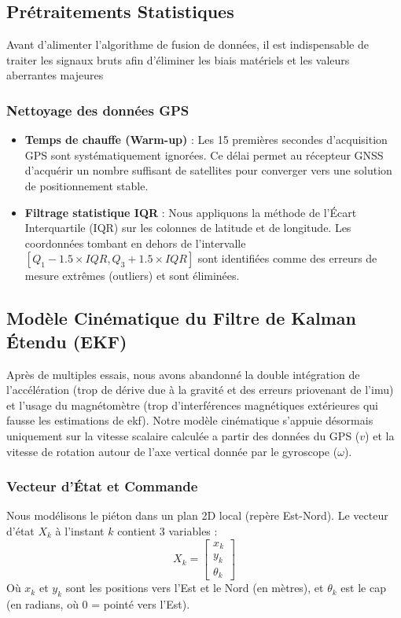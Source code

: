 \subsection{Prétraitements Statistiques}

Avant d'alimenter l'algorithme de fusion de données, il est indispensable de traiter les signaux bruts afin d'éliminer les biais matériels et les valeurs aberrantes majeures

\subsubsection{Nettoyage des données GPS}
\begin{itemize}
    \item[$\bullet$] \textbf{Temps de chauffe (Warm-up)} : Les 15 premières secondes d'acquisition GPS sont systématiquement ignorées. Ce délai permet au récepteur GNSS d'acquérir un nombre suffisant de satellites pour converger vers une solution de positionnement stable.
    \item[$\bullet$] \textbf{Filtrage statistique IQR} : Nous appliquons la méthode de l'Écart Interquartile (IQR) sur les colonnes de latitude et de longitude. Les coordonnées tombant en dehors de l'intervalle $[Q_1 - 1.5 \times IQR, Q_3 + 1.5 \times IQR]$ sont identifiées comme des erreurs de mesure extrêmes (outliers) et sont éliminées.
\end{itemize}



\subsection{Modèle Cinématique du Filtre de Kalman Étendu (EKF)}
\label{sec:ekf}

Après de multiples essais, nous avons abandonné la double intégration de l'accélération (trop de dérive due à la gravité et des erreurs priovenant de l'imu) et l'usage du magnétomètre (trop d'interférences magnétiques extérieures qui fausse les estimations de ekf). Notre modèle cinématique s'appuie désormais uniquement sur la vitesse scalaire calculée a partir des données du GPS ($v$) et la vitesse de rotation autour de l'axe vertical donnée par le gyroscope ($\omega$).

\subsubsection{Vecteur d'État et Commande}
Nous modélisons le piéton dans un plan 2D local (repère Est-Nord). Le vecteur d'état $X_k$ à l'instant $k$ contient 3 variables :
\begin{equation}
 X_k = \begin{bmatrix} x_k \\ y_k \\ \theta_k \end{bmatrix} 
\end{equation}
Où $x_k$ et $y_k$ sont les positions vers l'Est et le Nord (en mètres), et $\theta_k$ est le cap (en radians, où 0 = pointé vers l'Est).

